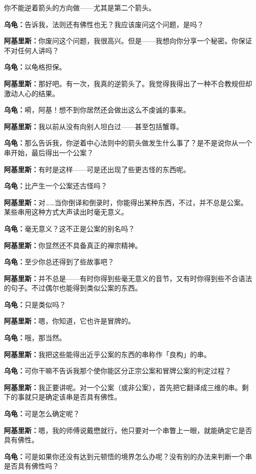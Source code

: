 \documentclass[
  12pt,
  twoside,
  openright,
  oldfontcommands,
]{memoir}
\newcommand{\dialogname}[1]{{\heifamily\bfseries #1}}
\begin{document}
你不能逆着箭头的方向做------尤其是第二个箭头。

\dialogname{乌龟：}告诉我，法则还有佛性也无？我应该废问这个问题，是吗？

\dialogname{阿基里斯：}你废问这个问题，我很高兴。但是------我想向你分享一个秘密。你保证不对任何人讲吗？

\dialogname{乌龟：}以龟格担保。

\dialogname{阿基里斯：}那好吧。有一次，我真的逆箭头了。我觉得我得出了一种不合教规但却激动人心的结果。

\dialogname{乌龟：}嗬，阿基！想不到你居然还会做出这么不虔诚的事来。

\dialogname{阿基里斯：}我以前从没有向别人坦白过------甚至包括蟹尊。

\dialogname{乌龟：}那么告诉我，你逆着中心法则中的箭头做发生什么事了？是不是说你从一个串开始，最后得出一个公案？

\dialogname{阿基里斯：}有时是这样------可是还出现了些更古怪的东西呢。

\dialogname{乌龟：}比产生一个公案还古怪吗？

\dialogname{阿基里斯：}对\ldots\ldots 当你倒译和倒录时，你能得出某种东西，不过，并不总是公案。某些串用这种方式大声读出时毫无意义。

\dialogname{乌龟：}毫无意义？这不正是公案的别名吗？

\dialogname{阿基里斯：}你显然还不具备真正的禅宗精神。

\dialogname{乌龟：}至少你总还得到了些故事吧？

\dialogname{阿基里斯：}并不总是------有时你得到些毫无意义的音节，又有时你得到些不合语法的句子。不过偶尔也能得到类似公案的东西。

\dialogname{乌龟：}只是类似吗？

\dialogname{阿基里斯：}嗯，你知道，它也许是冒牌的。

\dialogname{乌龟：}哦，那当然。

\dialogname{阿基里斯：}我把这些能得出近乎公案的东西的串称作「良构」的串。

\dialogname{乌龟：}可你干嘛不告诉我那个使你能区分正宗公案和冒牌公案的判定过程？

\dialogname{阿基里斯：}我正要讲呢。对一个公案（或非公案），首先把它翻译成三维的串。剩下的事就只是确定该串是否具有佛性。

\dialogname{乌龟：}可是怎么确定呢？

\dialogname{阿基里斯：}嗯，我的师傅说戴懋就行，他只要对一个串瞥上一眼，就能确定它是否具有佛性。

\dialogname{乌龟：}可是如果你还没有达到元顿悟的境界怎么办呢？没有别的办法来判断一个串是否具有佛性吗？
\end{document}
